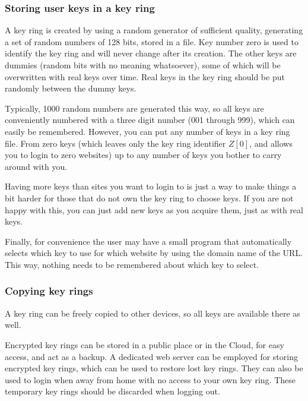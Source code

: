 \subsubsection{Storing user keys in a key ring}
\label{sec:key ring}
A key ring is created by using a random generator of sufficient quality,
generating a set of random numbers of 128 bits,
stored in a file.
Key number zero is used to identify the key ring and will never change after its creation.
The other keys are dummies
(random bits with no meaning whatsoever),
some of which will be overwritten with real keys over time.
Real keys in the key ring should be put randomly between the dummy keys.
\par
Typically,
1000 random numbers are generated this way,
so all keys are conveniently numbered with a three digit number
(001 through 999),
which can easily be remembered.
However,
you can put any number of keys in a key ring file.
From zero keys
(which leaves only the key ring identifier $Z[0]$,
and allows you to login to zero websites)
up to any number of keys you bother to carry around with you.
\par
Having more keys than sites you want to login to is just a way to make things
a bit harder for those that do not own the key ring to choose keys.
If you are not happy with this,
you can just add new keys as you acquire them,
just as with real keys.
\par
Finally,
for convenience the user may have a small program that automatically selects
which key to use for which website by using the domain name of the URL.
This way,
nothing needs to be remembered about which key to select.

\subsubsection{Copying key rings}
A key ring can be freely copied to other devices, so all keys are available there as well.
\par
Encrypted key rings can be stored in a public place or in the Cloud,
for easy access,
and act as a backup.
A dedicated web server can be employed for storing encrypted key rings,
which can be used to restore lost key rings.
They can also be used to login when away from home with no access to your own key ring.
These temporary key rings should be discarded when logging out.

